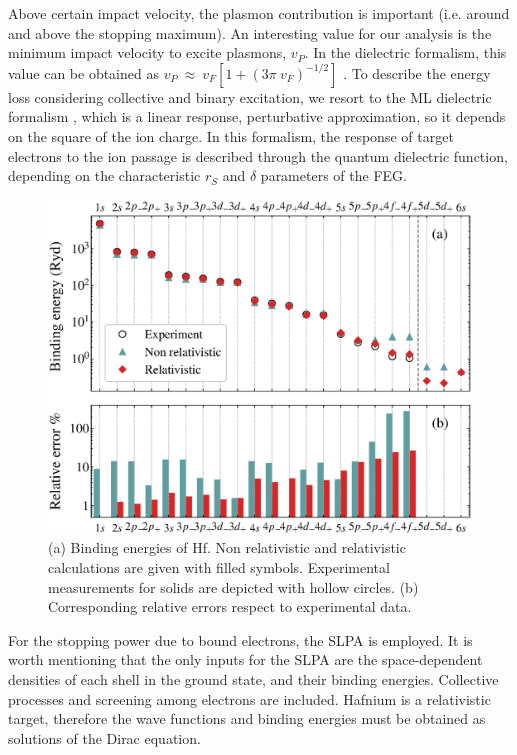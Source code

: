 \documentclass[aps,prb,reprint,groupedaddress]{revtex4-1}
\begin{document}
Above certain impact velocity, the plasmon contribution is important (i.e. around and above the stopping maximum). An interesting value for our analysis is the minimum impact velocity to excite
plasmons, $v_P$. In the dielectric formalism, this value can be obtained as $v_P\ \approx \ v_F[1+(3 \pi\ v_F)^{-1/2} ]$ \cite{suppression}. To describe the energy loss considering collective and binary excitation, we resort to the ML dielectric formalism \cite{Mermin}, which is a linear response, perturbative approximation, so it depends on the square of the ion charge. In this formalism, the response of target electrons to the ion passage is described through the quantum dielectric function, depending on the characteristic $r_S$ and $\delta$ parameters of the FEG. 

\begin{figure}[!t]
\centering
\includegraphics[width=11.cm]{Hf_bindener_bar.eps}
\caption{(a) Binding energies of Hf. Non relativistic and relativistic calculations are given with filled symbols.  Experimental measurements for solids\cite{williams1995} are depicted with hollow circles. (b) Corresponding relative errors respect to experimental data.}
\label{Binding_E}
\end{figure}

For the stopping power due to bound electrons, the SLPA \cite{mon17,mon13} is employed. It is worth mentioning that the only inputs for the SLPA are the space-dependent densities of each shell in the ground state, and their binding energies. Collective processes and screening among electrons are included. Hafnium is a relativistic target, therefore the wave functions and binding energies must be obtained as solutions of the Dirac equation\cite{mendez2019}.
\end{document}
